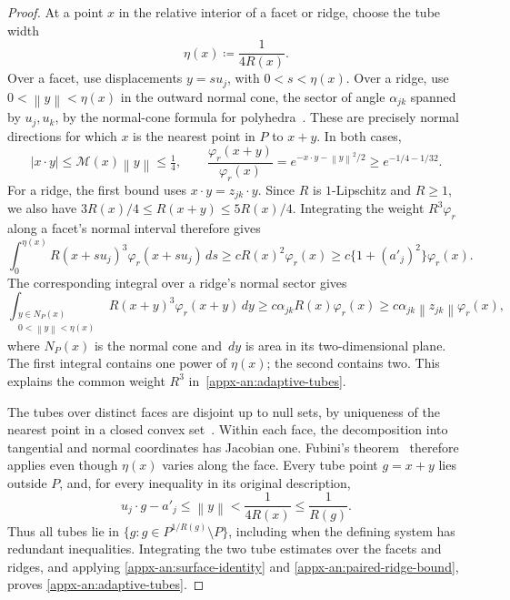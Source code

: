 \documentclass[11pt,letterpaper]{article}
\theoremstyle{remark}
\newcommand{\norm}[1]{\left\lVert#1\right\rVert}
\newcommand{\dd}{\,d}
\begin{document}
\begin{proof}
At a point \(x\) in the relative interior of a facet or ridge, choose
the tube width
\[
 \eta(x)\coloneqq \frac1{4R(x)}.
\]
Over a facet, use displacements \(y=s u_j\), with \(0<s<\eta(x)\).
Over a ridge, use \(0<\norm y<\eta(x)\) in the outward normal cone,
the sector of angle \(\alpha_{jk}\) spanned by \(u_j,u_k\), by the
normal-cone formula for polyhedra~\cite[Theorem~6.46]{RockafellarWets1998}.
These are precisely normal directions for which \(x\) is the nearest
point in \(P\) to \(x+y\). In both cases,
\[
 |x\cdot y|\le\mathcal M(x)\norm y\le\tfrac14,\qquad
 \frac{\varphi_r(x+y)}{\varphi_r(x)}
       =e^{-x\cdot y-\norm y^2/2}\ge e^{-1/4-1/32}.
\]
For a ridge, the first bound uses \(x\cdot y=z_{jk}\cdot y\).
Since \(R\) is \(1\)-Lipschitz and \(R\ge1\), we also have
\(3R(x)/4\le R(x+y)\le5R(x)/4\).
Integrating the weight \(R^3\varphi_r\) along a facet's normal
interval therefore gives
\[
 \int_0^{\eta(x)} R(x+s u_j)^3\varphi_r(x+s u_j)\dd s
 \ge cR(x)^2\varphi_r(x)
 \ge c\{1+(a'_j)^2\}\varphi_r(x).
\]
The corresponding integral over a ridge's normal sector gives
\[
 \int_{\substack{y\in N_P(x)\\0<\norm y<\eta(x)}}
        R(x+y)^3\varphi_r(x+y)\dd y
 \ge c\alpha_{jk}R(x)\varphi_r(x)
 \ge c\alpha_{jk}\norm{z_{jk}}\varphi_r(x),
\]
where \(N_P(x)\) is the normal cone and \(\dd y\) is area in its
two-dimensional plane. The first integral contains one power of
\(\eta(x)\); the second contains two. This explains the common weight
\(R^3\) in~\eqref{appx-an:adaptive-tubes}.

The tubes over distinct faces are disjoint up to null sets, by
uniqueness of the nearest point in a closed convex
set~\cite[Example~2.25]{RockafellarWets1998}. Within each
face, the decomposition into tangential and normal coordinates has
Jacobian one. Fubini's theorem~\cite[Section~2.5]{Folland1999}
therefore applies even though
\(\eta(x)\) varies along the face. Every tube point \(g=x+y\) lies
outside \(P\), and, for every inequality in its original description,
\[
 u_j\cdot g-a'_j\le\norm y<\frac1{4R(x)}\le\frac1{R(g)}.
\]
Thus all tubes lie in \(\{g:g\in P^{1/R(g)}\setminus P\}\), including
when the defining system has redundant inequalities. Integrating the
two tube estimates over the facets and ridges, and applying
\eqref{appx-an:surface-identity} and
\eqref{appx-an:paired-ridge-bound}, proves
\eqref{appx-an:adaptive-tubes}.


\end{proof}
\end{document}
